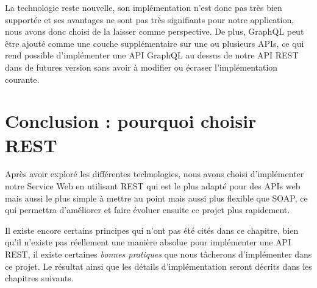 \begin{description}
La technologie reste nouvelle, son implémentation n'est donc pas très bien supportée et ses avantages ne sont pas très signifiants pour notre application, nous avons donc choisi de la laisser comme perspective. 
De plus, GraphQL peut être ajouté comme une couche supplémentaire sur une ou plusieurs APIs, ce qui rend possible d'implémenter une API GraphQL au dessus de notre API REST dans de futures version sans avoir à modifier ou écraser l'implémentation courante.
\end{description}

\section{Conclusion : pourquoi choisir REST}
	Après avoir exploré les différentes technologies, nous avons choisi d'implémenter notre Service Web en utilisant REST qui est le plus adapté pour des APIs web mais aussi le plus simple à mettre au point mais aussi plus flexible que SOAP, ce qui permettra d'améliorer et faire évoluer ensuite ce projet plus rapidement.
	
	Il existe encore certains principes qui n'ont pas été cités dans ce chapitre, bien qu'il n'existe pas réellement une manière absolue pour implémenter une API REST, il existe certaines \emph{bonnes pratiques} que nous tâcherons d'implémenter dans ce projet. Le résultat ainsi que les détails d'implémentation seront décrits dans les chapitres suivants.
